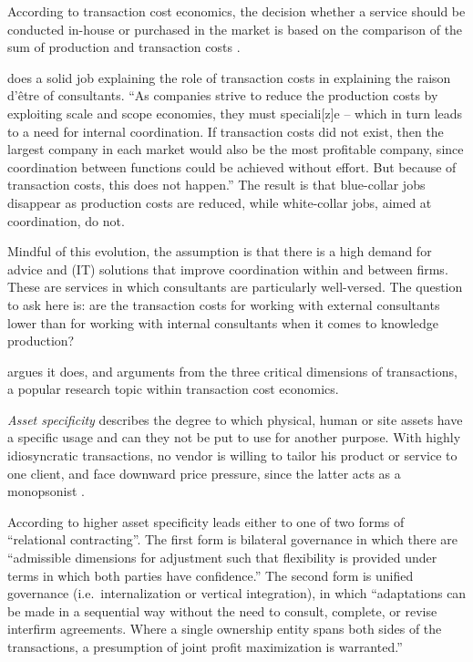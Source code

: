 \documentclass[12pt]{article}
\begin{document}
According to transaction cost economics, the decision whether a service
should be conducted in-house or purchased in the market is based on the
comparison of the sum of production and transaction costs \citep[
12]{armbruster2006}.

\citet[31]{canback1998} does a solid job explaining the role of
transaction costs in explaining the raison d'être of consultants. ``As
companies strive to reduce the production costs by exploiting scale and
scope economies, they must speciali{[}z{]}e -- which in turn leads to a
need for internal coordination. If transaction costs did not exist, then
the largest company in each market would also be the most profitable
company, since coordination between functions could be achieved without
effort. But because of transaction costs, this does not happen.'' The
result is that blue-collar jobs disappear as production costs are
reduced, while white-collar jobs, aimed at coordination, do not.

Mindful of this evolution, the assumption is that there is a high demand
for advice and (IT) solutions that improve coordination within and
between firms. These are services in which consultants are particularly
well-versed. The question to ask here is: are the transaction costs for
working with external consultants lower than for working with internal
consultants when it comes to knowledge production?

\citet[37-44]{canback1998} argues it does, and arguments from the three
critical dimensions of transactions, a popular research topic within
transaction cost economics.

\emph{Asset specificity} describes the degree to which physical, human
or site assets have a specific usage and can they not be put to use for
another purpose. With highly idiosyncratic transactions, no vendor is
willing to tailor his product or service to one client, and face
downward price pressure, since the latter acts as a monopsonist \citep[
218-228]{robinson1969}.

According to \citet[250-253]{williamson1979} higher asset specificity
leads either to one of two forms of ``relational contracting''. The
first form is bilateral governance in which there are ``admissible
dimensions for adjustment such that flexibility is provided under terms
in which both parties have confidence.'' The second form is unified
governance (i.e.~internalization or vertical integration), in which
``adaptations can be made in a sequential way without the need to
consult, complete, or revise interfirm agreements. Where a single
ownership entity spans both sides of the transactions, a presumption of
joint profit maximization is warranted.''
\end{document}
